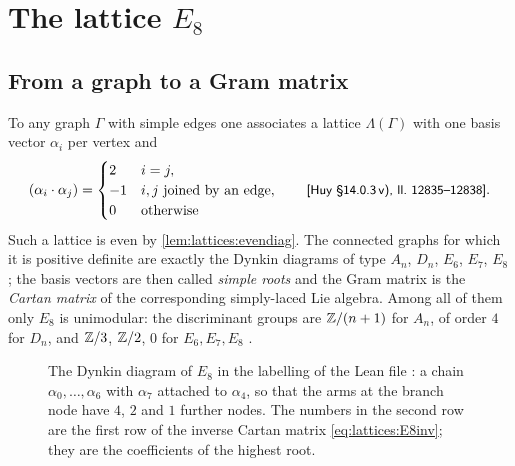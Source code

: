 \section{The lattice \texorpdfstring{$E_8$}{E8}}\label{sec:lattices:E8}

\subsection{From a graph to a Gram matrix}
To any graph $\Gamma$ with simple edges one associates a lattice $\Lambda(\Gamma)$ with one
basis vector $\alpha_i$ per vertex and
\begin{equation}\label{eq:lattices:graphlattice}
 (\alpha_i\cdot\alpha_j)=\begin{cases}2&i=j,\\-1&i,j\ \text{joined by an edge},\\
 0&\text{otherwise}\end{cases}
 \qquad\text{\source{Huy §14.0.3\,v), ll.~12835--12838}} .
\end{equation}
Such a lattice is even by \cref{lem:lattices:evendiag}. The connected graphs for which it is
positive definite are exactly the Dynkin diagrams of type $A_n$, $D_n$,
$E_6$, $E_7$, $E_8$ ; the basis vectors are then called
\emph{simple roots} and the Gram matrix is the \emph{Cartan
matrix} of the corresponding simply-laced Lie algebra. Among all of
them only $E_8$ is unimodular: the discriminant groups are $\mathbb{Z}/(n+1)$ for $A_n$, of order
$4$ for $D_n$, and $\mathbb{Z}/3$, $\mathbb{Z}/2$, $0$ for $E_6,E_7,E_8$ .

\begin{figure}[t]
\centering
{}
\caption{The Dynkin diagram of $E_8$ in the labelling of the Lean file : a
chain $\alpha_0,\dots,\alpha_6$ with $\alpha_7$ attached to $\alpha_4$, so that the arms at
the branch node have $4$, $2$ and $1$ further nodes. The numbers in the second row are the
first row of the inverse Cartan matrix \eqref{eq:lattices:E8inv}; they are the coefficients
of the highest root.}\label{fig:lattices:dynkin}
\end{figure}

